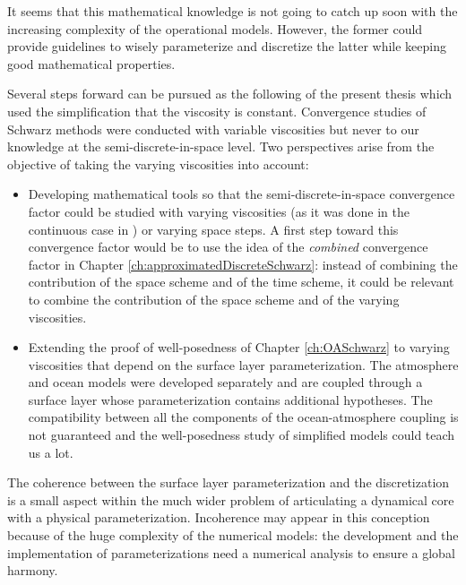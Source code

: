 It seems that this mathematical knowledge is not going to
catch up soon with the increasing complexity
of the operational models. However,
the former could provide guidelines to wisely
parameterize and discretize the latter while keeping
good mathematical properties.
\par
Several steps forward can be pursued as the
following of the present thesis which used the
simplification that the viscosity is constant.
Convergence studies of Schwarz methods
were conducted with variable viscosities but
never to our knowledge at the semi-discrete-in-space level.
Two perspectives arise from the objective of taking the
varying viscosities into account:
\begin{itemize}
	\item Developing mathematical tools so that the
		semi-discrete-in-space convergence factor could
		be studied with varying viscosities (as it was done
		in the continuous case in \citep{thery_etude_2021})
		or varying space steps.
		A first step toward this convergence factor
		would be to use the idea of the \textit{combined}
		convergence factor in
		Chapter \ref{ch:approximatedDiscreteSchwarz}:
		instead of combining the contribution of the
		space scheme and of the time scheme, it could
		be relevant to combine the contribution of
		the space scheme and of the varying viscosities.
	\item Extending the proof of well-posedness of Chapter
		\ref{ch:OASchwarz} to varying viscosities
		that depend on the surface layer parameterization.
		The atmosphere and ocean models were developed 
		separately and are coupled through a surface
		layer whose parameterization contains additional
		hypotheses. The compatibility between all the
		components of the ocean-atmosphere coupling
		is not guaranteed and the well-posedness
		study of simplified models could teach us a lot.
\end{itemize}
The coherence between the surface layer parameterization and
the discretization is a small aspect within the much wider problem of
articulating a dynamical core with a physical parameterization.
Incoherence may appear in this conception because of the huge
complexity of the numerical models:
the development and the implementation of parameterizations
need a numerical analysis to ensure a global harmony.

